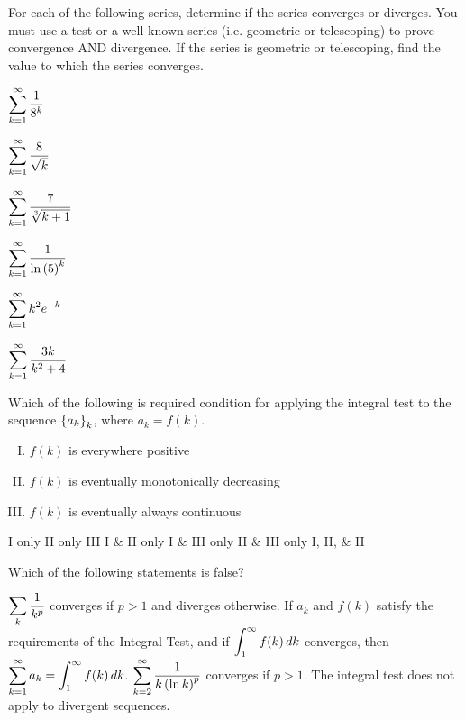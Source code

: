 For each of the following series, determine if the series converges or diverges. You must use a test or a well-known series (i.e. geometric or telescoping) to prove convergence AND divergence. If the series is geometric or telescoping, find the value to which the series converges.
\begin{questions}

\question $\displaystyle \sum_{k=1}^{\infty}\frac{1}{8^k}$\seriesproof

\question $\displaystyle \sum_{k=1}^{\infty}\frac{8}{\sqrt{k}}$\seriesproof

\question $\displaystyle \sum_{k=1}^{\infty} \frac{7}{ \sqrt[3]{k+1} }$\seriesproof

\vfill

\question $\displaystyle \sum_{k=1}^{\infty} \frac{1}{\ln\left(5\right)^k}$\seriesproof

\newpage

\question $\displaystyle \sum_{k=1}^{\infty} k^2e^{-k}$\seriesproof

\vfill

\question $\displaystyle \sum_{k=1}^{\infty} \frac{3k}{k^2+4}$\seriesproof

\newpage

\question Which of the following is required condition for applying the integral test to the sequence $\displaystyle \left\{a_k\right\}_{k}$, where $a_k=f(k)$.
\begin{enumerate}[I.]
  \item $f(k)$ is everywhere positive
  \item $f(k)$ is eventually monotonically decreasing
  \item $f(k)$ is eventually always continuous
\end{enumerate}

\begin{choices}
  \choice I only
  \choice II only
  \choice III
  \choice I \& II only
  \choice I \& III only
  \choice II \& III only
  \choice I, II, \& II
\end{choices}\vfill

\question Which of the following statements is false?
\begin{choices}
\choice $\displaystyle \sum_{k}\frac{1}{k^p}$ converges if $p>1$ and diverges otherwise.
\choice If $\displaystyle a_k$ and $\displaystyle f(k)$ satisfy the requirements of the Integral Test, and if $\displaystyle \int_{1}^{\infty} f(k) \,d{k}$ converges, then $\displaystyle \sum_{k=1}^{\infty}a_k=\displaystyle \int_{1}^{\infty} f(k) \,d{k}$.
\choice $\displaystyle \sum_{k=2}^{\infty} \frac{1}{k\left(\ln k\right)^p}$ converges if $p>1$.
\choice The integral test does not apply to divergent sequences.
\end{choices}\vfill


\end{questions}
